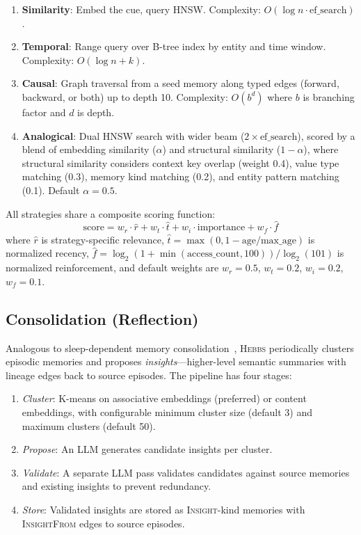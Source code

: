 \documentclass{article}
\begin{document}
\begin{enumerate}
    \item \textbf{Similarity}: Embed the cue, query HNSW. Complexity: $O(\log n \cdot \text{ef\_search})$.
    \item \textbf{Temporal}: Range query over B-tree index by entity and time window. Complexity: $O(\log n + k)$.
    \item \textbf{Causal}: Graph traversal from a seed memory along typed edges (forward, backward, or both) up to depth 10. Complexity: $O(b^d)$ where $b$ is branching factor and $d$ is depth.
    \item \textbf{Analogical}: Dual HNSW search with wider beam ($2 \times \text{ef\_search}$), scored by a blend of embedding similarity ($\alpha$) and structural similarity ($1 - \alpha$), where structural similarity considers context key overlap (weight 0.4), value type matching (0.3), memory kind matching (0.2), and entity pattern matching (0.1). Default $\alpha = 0.5$.
\end{enumerate}

All strategies share a composite scoring function:
\begin{equation}
    \text{score} = w_r \cdot \hat{r} + w_t \cdot \hat{t} + w_i \cdot \text{importance} + w_f \cdot \hat{f}
    \label{eq:scoring}
\end{equation}
where $\hat{r}$ is strategy-specific relevance, $\hat{t} = \max(0, 1 - \text{age}/\text{max\_age})$ is normalized recency, $\hat{f} = \log_2(1 + \min(\text{access\_count}, 100)) / \log_2(101)$ is normalized reinforcement, and default weights are $w_r{=}0.5$, $w_t{=}0.2$, $w_i{=}0.2$, $w_f{=}0.1$.

\subsection{Consolidation (Reflection)}
\label{sec:consolidation}

Analogous to sleep-dependent memory consolidation~\citep{diekelmann2010}, \textsc{Hebbs} periodically clusters episodic memories and proposes \emph{insights}---higher-level semantic summaries with lineage edges back to source episodes. The pipeline has four stages:

\begin{enumerate}
    \item \emph{Cluster}: K-means on associative embeddings (preferred) or content embeddings, with configurable minimum cluster size (default 3) and maximum clusters (default 50).
    \item \emph{Propose}: An LLM generates candidate insights per cluster.
    \item \emph{Validate}: A separate LLM pass validates candidates against source memories and existing insights to prevent redundancy.
    \item \emph{Store}: Validated insights are stored as \textsc{Insight}-kind memories with \textsc{InsightFrom} edges to source episodes.
\end{enumerate}
\end{document}
